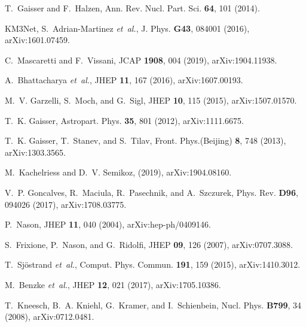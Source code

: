 \documentclass[a4paper,11pt]{article}
\begin{document}
\begin{thebibliography}{99}
T.~Gaisser and F.~Halzen,
\newblock Ann. Rev. Nucl. Part. Sci. {\bf 64}, 101 (2014).

KM3Net, S.~Adrian-Martinez {\em et~al.},
\newblock J. Phys. {\bf G43}, 084001 (2016), arXiv:1601.07459.

C.~Mascaretti and F.~Vissani,
\newblock JCAP {\bf 1908}, 004 (2019), arXiv:1904.11938.

A.~Bhattacharya {\em et~al.},
\newblock JHEP {\bf 11}, 167 (2016), arXiv:1607.00193.

M.~V. Garzelli, S.~Moch, and G.~Sigl,
\newblock JHEP {\bf 10}, 115 (2015), arXiv:1507.01570.

T.~K. Gaisser,
\newblock Astropart. Phys. {\bf 35}, 801 (2012), arXiv:1111.6675.

T.~K. Gaisser, T.~Stanev, and S.~Tilav,
\newblock Front. Phys.(Beijing) {\bf 8}, 748 (2013), arXiv:1303.3565.

M.~Kachelriess and D.~V. Semikoz,
\newblock (2019), arXiv:1904.08160.

V.~P. Goncalves, R.~Maciula, R.~Pasechnik, and A.~Szczurek,
\newblock Phys. Rev. {\bf D96}, 094026 (2017), arXiv:1708.03775.

P.~Nason,
\newblock JHEP {\bf 11}, 040 (2004), arXiv:hep-ph/0409146.

S.~Frixione, P.~Nason, and G.~Ridolfi,
\newblock JHEP {\bf 09}, 126 (2007), arXiv:0707.3088.

T.~Sj{\"o}strand {\em et~al.},
\newblock Comput. Phys. Commun. {\bf 191}, 159 (2015), arXiv:1410.3012.

M.~Benzke {\em et~al.},
\newblock JHEP {\bf 12}, 021 (2017), arXiv:1705.10386.

T.~Kneesch, B.~A. Kniehl, G.~Kramer, and I.~Schienbein,
\newblock Nucl. Phys. {\bf B799}, 34 (2008), arXiv:0712.0481.


\end{thebibliography}
\end{document}
